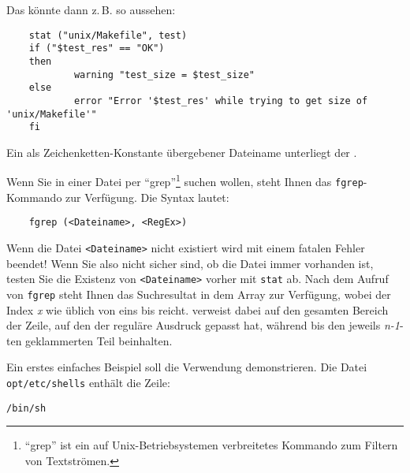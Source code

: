     Das könnte dann z.\,B. so aussehen:

\begin{example}
\begin{verbatim}
    stat ("unix/Makefile", test)
    if ("$test_res" == "OK")
    then
            warning "test_size = $test_size"
    else
            error "Error '$test_res' while trying to get size of 'unix/Makefile'"
    fi
\end{verbatim}
\end{example}

    Ein als Zeichenketten-Konstante übergebener Dateiname unterliegt der
    .


    Wenn Sie in einer Datei per "`grep"'\footnote{"`grep"' ist ein auf
    Unix-Betriebsystemen verbreitetes Kommando zum Filtern von Textströmen.}
    suchen wollen, steht Ihnen das
    \texttt{fgrep}-Kommando zur Verfügung. Die Syntax lautet:

\begin{example}
\begin{verbatim}
    fgrep (<Dateiname>, <RegEx>)
\end{verbatim}
\end{example}

    Wenn die Datei \texttt{<Dateiname>} nicht existiert wird 
    mit einem fatalen Fehler beendet! Wenn Sie also nicht sicher sind,
    ob die Datei immer vorhanden ist, testen Sie die Existenz von
    \texttt{<Dateiname>} vorher mit \texttt{stat} ab. Nach dem Aufruf von
    \texttt{fgrep} steht Ihnen das Suchresultat in dem Array
     zur Verfügung, wobei der Index \emph{x} wie üblich
    von eins bis  reicht.  verweist
    dabei auf den gesamten Bereich der Zeile, auf den der reguläre Ausdruck
    gepasst hat, während  bis  den
    jeweils \emph{n-1}-ten geklammerten Teil beinhalten.

    Ein erstes einfaches Beispiel soll die Verwendung demonstrieren. Die Datei
    \texttt{opt/etc/shells} enthält die Zeile:

\begin{example}
\begin{verbatim}
/bin/sh
\end{verbatim}
\end{example}

